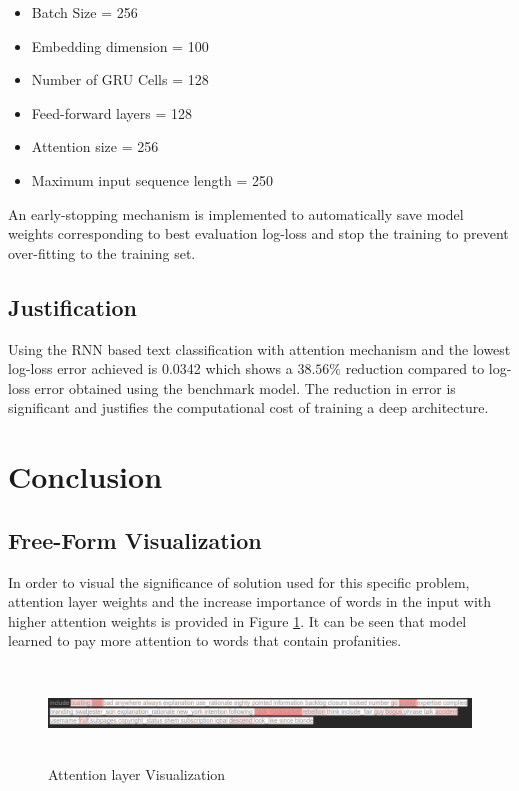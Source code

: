\documentclass{article}
\begin{document}
    \begin{itemize}
        \item Batch Size = 256
        \item Embedding dimension = 100
        \item Number of GRU Cells = 128
        \item Feed-forward layers = 128
        \item Attention size = 256
        \item Maximum input sequence length = 250
    \end{itemize}

    An early-stopping mechanism is implemented to automatically save model weights corresponding to best evaluation log-loss and stop the training to prevent over-fitting to the training set.


    \subsection{Justification}
    
    Using the RNN based text classification with attention mechanism and the lowest log-loss error achieved is 0.0342 which shows a $38.56\%$ reduction compared to log-loss error obtained using the benchmark model. The reduction in error is significant and justifies the computational cost of training a deep architecture.


\section{Conclusion}


    \subsection{Free-Form Visualization}

    In order to visual the significance of solution used for this specific problem, attention layer weights and the increase importance of words in the input with higher attention weights is provided in Figure \ref{fig:att_image}. It can be seen that model learned to pay more attention to words that contain profanities.
    
    \begin{figure}
        \centering
        \includegraphics[width=7in, height=1in]{att_image.png}
        \caption{Attention layer Visualization}
        \label{fig:att_image}
    \end{figure}    
\end{document}
